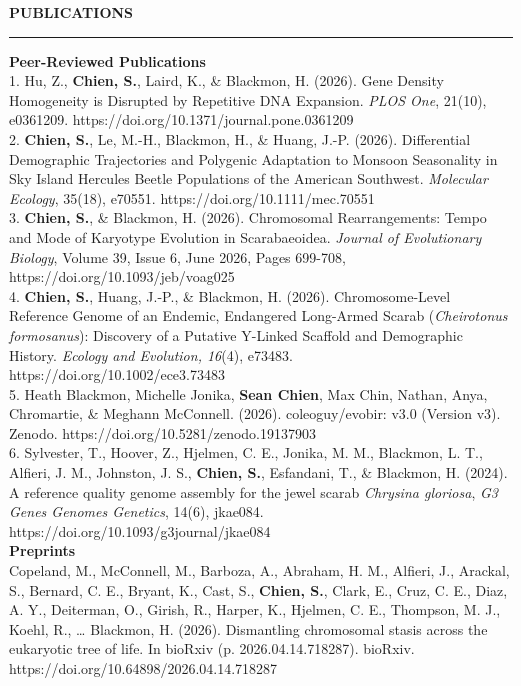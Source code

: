 \documentclass[11pt, a4paper]{article}
\begin{document}
\begin{center}
\textbf{PUBLICATIONS}\\
\vspace{-0.8em}
\noindent\rule{\linewidth}{0.4pt}
\vspace{-2em}
\begin{flushleft} 
\textbf{Peer-Reviewed Publications} \\[0.4em]
  1. Hu, Z., \textbf{Chien, S.}, Laird, K., \& Blackmon, H. (2026). Gene Density Homogeneity is Disrupted by Repetitive DNA Expansion. \textit{PLOS One}, 21(10), e0361209. https://doi.org/10.1371/journal.pone.0361209 \\[0.4em]
  2. \textbf{Chien, S.}, Le, M.-H., Blackmon, H., \& Huang, J.-P. (2026). Differential Demographic Trajectories and Polygenic Adaptation to Monsoon Seasonality in Sky Island Hercules Beetle Populations of the American Southwest. \textit{Molecular Ecology}, 35(18), e70551. https://doi.org/10.1111/mec.70551 \\[0.4em] 
  3. \textbf{Chien, S.}, \& Blackmon, H. (2026). Chromosomal Rearrangements: Tempo and Mode of Karyotype Evolution in Scarabaeoidea. \textit{Journal of Evolutionary Biology}, Volume 39, Issue 6, June 2026, Pages 699-708, https://doi.org/10.1093/jeb/voag025 \\[0.4em]
  4. \textbf{Chien, S.}, Huang, J.-P., \& Blackmon, H. (2026). Chromosome-Level Reference Genome of an Endemic, Endangered Long-Armed Scarab (\textit{Cheirotonus formosanus}): Discovery of a Putative Y-Linked Scaffold and Demographic History. \textit{Ecology and Evolution, 16}(4), e73483. https://doi.org/10.1002/ece3.73483 \\[0.4em]
  5. Heath Blackmon, Michelle Jonika, \textbf{Sean Chien}, Max Chin, Nathan, Anya, Chromartie, \& Meghann McConnell. (2026). coleoguy/evobir: v3.0 (Version v3). Zenodo. https://doi.org/10.5281/zenodo.19137903 \\[0.4em]
  6. Sylvester, T., Hoover, Z., Hjelmen, C. E., Jonika, M. M., Blackmon, L. T., Alfieri, J. M., Johnston, J. S., \textbf{Chien, S.}, Esfandani, T., \& Blackmon, H. (2024). A reference quality genome assembly for the jewel scarab \textit{Chrysina gloriosa}, \textit{G3 Genes \textbar Genomes \textbar Genetics}, 14(6), jkae084. https://doi.org/10.1093/g3journal/jkae084 \\[0.4em]

  
\textbf{Preprints} \\[0.4em]
Copeland, M., McConnell, M., Barboza, A., Abraham, H. M., Alfieri, J., Arackal, S., Bernard, C. E., Bryant, K., Cast, S., \textbf{Chien, S.}, Clark, E., Cruz, C. E., Diaz, A. Y., Deiterman, O., Girish, R., Harper, K., Hjelmen, C. E., Thompson, M. J., Koehl, R., … Blackmon, H. (2026). Dismantling chromosomal stasis across the eukaryotic tree of life. In bioRxiv (p. 2026.04.14.718287). bioRxiv. https://doi.org/10.64898/2026.04.14.718287 \\[0.4em]
\end{flushleft}
\vspace{+0.5em}


\end{center}
\end{document}
